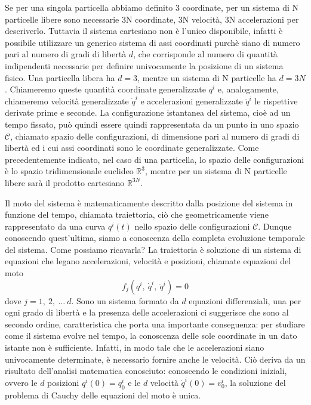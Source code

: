     Se per una singola particella abbiamo definito 3 coordinate, per un sistema di N particelle libere sono necessarie 3N coordinate, 3N velocità, 3N accelerazioni per descriverlo. Tuttavia il sistema cartesiano non è l'unico disponibile, infatti è possibile utilizzare un generico sistema di assi coordinati purchè siano di numero pari al numero di gradi di libertà $d$, che corrisponde al numero di quantità indipendenti necessarie per definire univocamente la posizione di un sistema fisico. Una particella libera ha $d = 3$, mentre un sistema di N particelle ha $d = 3N$. Chiameremo queste quantità coordinate generalizzate $q^i$ e, analogamente, chiameremo velocità generalizzate $\dot q^i$ e accelerazioni generalizzate $\ddot q^i$ le rispettive derivate prime e seconde. La configurazione istantanea del sistema, cioè ad un tempo fissato, può quindi essere quindi rappresentata da un punto in uno spazio $\mathcal C$, chiamato spazio delle configurazioni, di dimensione pari al numero di gradi di libertà ed i cui assi coordinati sono le coordinate generalizzate. Come precedentemente indicato, nel caso di una particella, lo spazio delle configurazioni è lo spazio tridimensionale euclideo $\mathbb R^3$, mentre per un sistema di N particelle libere sarà il prodotto cartesiano $\mathbb R^{3N}$.
    
    Il moto del sistema è matematicamente descritto dalla posizione del sistema in funzione del tempo, chiamata traiettoria, ciò che geometricamente viene rappresentato da una curva $q^i(t)$ nello spazio delle configurazioni $\mathcal C$. Dunque conoscendo quest'ultima, siamo a conoscenza della completa evoluzione temporale del sistema. Come possiamo ricavarla? La traiettoria è soluzione di un sistema di equazioni che legano accelerazioni, velocità e posizioni, chiamate equazioni del moto
    \begin{equation} \label{eqmoto}
        f_j(q^i, ~ \dot q^i, ~ \ddot q^i) = 0
    \end{equation}
    dove $j = 1, ~2, ~\ldots ~d$. Sono un sistema formato da $d$ equazioni differenziali, una per ogni grado di libertà e la presenza delle accelerazioni ci suggerisce che sono al secondo ordine, caratteristica che porta una importante conseguenza: per studiare come il sistema evolve nel tempo, la conoscenza delle sole coordinate in un dato istante non è sufficiente. Infatti, in modo tale che le accelerazioni siano univocamente determinate, è necessario fornire anche le velocità. Ciò deriva da un risultato dell'analisi matematica conosciuto: conoscendo le condizioni iniziali, ovvero le $d$ posizioni $q^i(0) = q^i_0$ e le $d$ velocità $\dot q^i(0) = v^i_0$, la soluzione del problema di Cauchy delle equazioni del moto è unica. 
    
